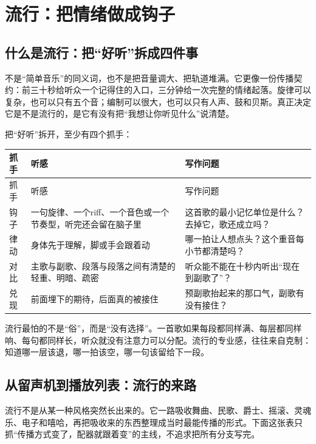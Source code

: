 \chapter{流行：把情绪做成钩子}
\label{ch:genre-pop-deep}


\section{什么是流行：把“好听”拆成四件事}
\label{sec:pop-what}

不是“简单音乐”的同义词，也不是把音量调大、把轨道堆满。它更像一份传播契约：前三十秒给听众一个记得住的入口，三分钟给一次完整的情绪起落。旋律可以复杂，也可以只有五个音；编制可以很大，也可以只有人声、鼓和贝斯。真正决定它是不是流行的，是它有没有把“我想让你听见什么”说清楚。

把“好听”拆开，至少有四个抓手：

\begin{longtable}{p{}p{}p{}}
\toprule
抓手 & 听感 & 写作问题 \\
\midrule
\endfirsthead
\toprule
抓手 & 听感 & 写作问题 \\
\midrule
\endhead
钩子 & 一句旋律、一个riff、一个音色或一个节奏型，听完还会留在脑子里 & 这首歌的最小记忆单位是什么？去掉它，歌还成立吗？ \\
律动 & 身体先于理解，脚或手会跟着动 & 哪一拍让人想点头？这个重音每小节都清楚吗？ \\
对比 & 主歌与副歌、段落与段落之间有清楚的轻重、明暗、疏密 & 听众能不能在十秒内听出“现在到副歌了”？ \\
兑现 & 前面埋下的期待，后面真的被接住 & 预副歌抬起来的那口气，副歌有没有接住？ \\
\bottomrule
\end{longtable}

流行最怕的不是“俗”，而是“没有选择”。一首歌如果每段都同样满、每层都同样响、每句都同样长，听众就没有注意力可以分配。流行的专业感，往往来自克制：知道哪一层该退，哪一拍该空，哪一句该留给下一段。

\section{从留声机到播放列表：流行的来路}
\label{sec:pop-history}

流行不是从某一种风格突然长出来的。它一路吸收舞曲、民歌、爵士、摇滚、灵魂乐、电子和嘻哈，再把吸收来的东西整理成当时最能传播的形式。下面这张表只抓“传播方式变了，配器就跟着变”的主线，不追求把所有分支写完。

